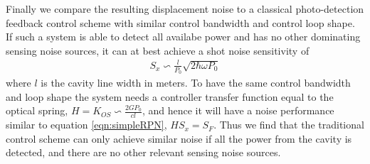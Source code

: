 Finally we compare the resulting displacement noise to a classical photo-detection feedback control scheme with similar control bandwidth and control loop shape. If such a system is able to detect all availabe power and has no other dominating sensing noise sources, it can at best achieve a shot noise sensitivity of 
\begin{eqnarray}
\label{eqn:classyShot}
S_x \backsim \frac{l}{P_0}\sqrt{2 \hbar \omega P_0}
\end{eqnarray}
where $l$ is the cavity line width in meters. To have the same control bandwidth and loop shape the system needs a controller transfer function equal to the optical spring, $H = K_{OS} \backsim \frac{2 G P_0}{c l}$, and hence it will have a  noise performance similar to equation \ref{eqn:simpleRPN},  $H S_x=S_F$.  
Thus we find that the traditional control scheme can only achieve similar noise if all the power from the cavity is detected, and there are no other relevant sensing noise sources. 



